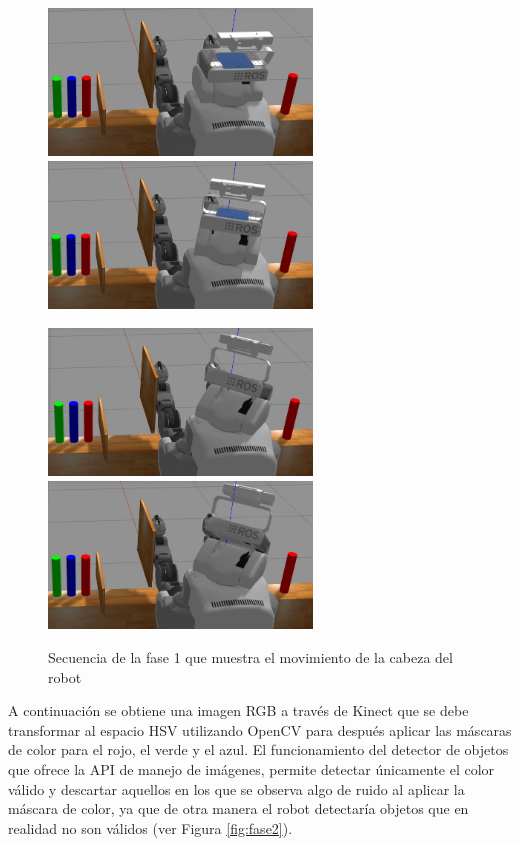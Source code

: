 \documentclass[12pt,spanish,chapterprefix, numbers=noenddot]{book}
\numberwithin{equation}{section}
\numberwithin{figure}{section}
\begin{document}
\begin{figure}[hbt!]
\centering
\includegraphics[width=7cm]{Figs/fase1_1.png}
\includegraphics[width=7cm]{Figs/fase1_2.png}
\par
\centering
\includegraphics[width=7cm]{Figs/fase1_3.png}
\includegraphics[width=7cm]{Figs/fase1_4.png}
\par
\caption{\label{fig:fase1}Secuencia de la fase 1 que muestra el movimiento de la cabeza del robot}
\end{figure}

A continuación se obtiene una imagen RGB a través de Kinect que se debe transformar al espacio HSV utilizando OpenCV para después aplicar las máscaras de color para el rojo, el verde y el azul. El funcionamiento del detector de objetos que ofrece la API de manejo de imágenes, permite detectar únicamente el color válido y descartar aquellos en los que se observa algo de ruido al aplicar la máscara de color, ya que de otra manera el robot detectaría objetos que en realidad no son válidos (ver Figura \ref{fig:fase2}).
\end{document}
